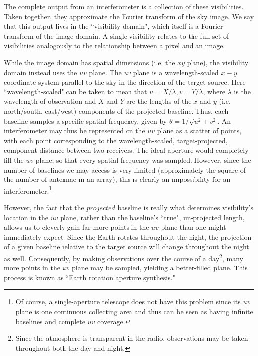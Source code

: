 The complete output from an interferometer is a collection of these visibilities. Taken together, they approximate the Fourier transform of the sky image. We say that this output lives in the ``visibility domain", which itself is a Fourier transform of the image domain. A single visibility relates to the full set of visibilities analogously to the relationship between a pixel and an image.


While the image domain has spatial dimensions (i.e. the $xy$ plane), the visibility domain instead uses the $uv$ plane. The $uv$ plane is a wavelength-scaled $x-y$ coordinate system parallel to the sky in the direction of the target source. Here ``wavelength-scaled" can be taken to mean that $u = X/\lambda, v = Y/\lambda$, where $\lambda$ is the wavelength of observation and $X$ and $Y$ are the lengths of the $x$ and $y$ (i.e. north/south, east/west) components of the projected baseline. Thus, each baseline samples a specific spatial frequency, given by $\theta = 1/\sqrt{u^2 + v^2}$. An interferometer may thus be represented on the $uv$ plane as a scatter of points, with each point corresponding to the wavelength-scaled, target-projected, component distance between two receivers. The ideal aperture would completely fill the $uv$ plane, so that every spatial frequency was sampled. However, since the number of baselines we may access is very limited (approximately the square of the number of antennae in an array), this is clearly an impossibility for an interferometer.\footnote{Of course, a single-aperture telescope does not have this problem since its $uv$ plane is one continuous collecting area and thus can be seen as having infinite baselines and complete $uv$ coverage.}


However, the fact that the $projected$ baseline is really what determines visibility's location in the $uv$ plane, rather than the baseline's ``true", un-projected length, allows us to cleverly gain far more points in the $uv$ plane than one might immediately expect. Since the Earth rotates throughout the night, the projection of a given baseline relative to the target source will change throughout the night as well. Consequently, by making observations over the course of a day\footnote{Since the atmosphere is transparent in the radio, observations may be taken throughout both the day and night.}, many more points in the $uv$ plane may be sampled, yielding a better-filled plane. This process is known as ``Earth rotation aperture synthesis."

